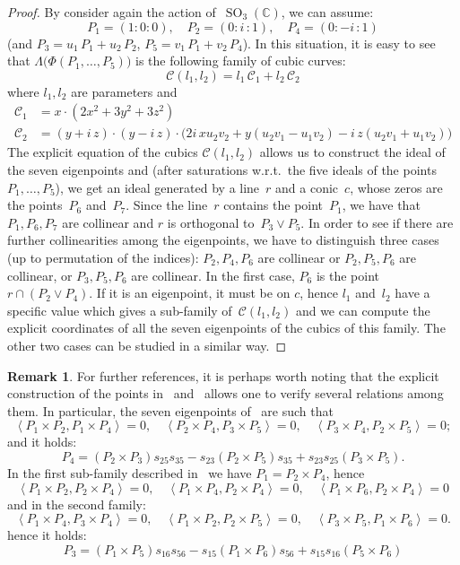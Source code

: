 \documentclass[a4paper, 11pt, reqno]{amsart}
\theoremstyle{plain}
\theoremstyle{definition}
\newtheorem{rmk}[lemma]{Remark}
\newcommand{\C}{\mathbb{C}}
\newcommand{\iii}{\textit{i}\,}
\newcommand{\SO}{\operatorname{SO}}
\newcommand{\scl}[2]{\left\langle {#1}, {#2} \right\rangle}
\begin{document}
\begin{proof}
By consider again the action of~$\SO_3(\C)$, we can assume:
%
\[
  P_1 = (1: 0: 0), \quad
  P_2 = (0: \iii: 1), \quad
  P_4 = (0: -\iii: 1)
\]
%
(and $P_3 = u_1 \, P_1 + u_2 \, P_2$, $P_5 = v_1 \, P_1 + v_2 \, P_4$). 
In this situation, it
is easy to see that $\Lambda\bigl(\Phi(P_1, \dots, P_5)\bigr)$
is the following family of cubic curves:
%
\[
  \mathcal{C}(l_1, l_2) = l_1 \, \mathcal{C}_1 + l_2 \, \mathcal{C}_2
\]
%
where $l_1, l_2$ are parameters and
%
\begin{align*}
  \mathcal{C}_1 & = x \cdot \left(2x^{2} + 3 y^{2} + 3 z^{2}\right)\\
  \mathcal{C}_2 & = (y + \iii z) \cdot (y - \iii z)
  \cdot \bigl(2 \iii x u_{2} v_{2} + y (u_{2} v_{1}- u_{1} v_{2})
  - \iii z (u_{2} v_{1} + u_{1} v_{2})\bigr)
\end{align*}
%
The explicit equation of the cubics $\mathcal{C}(l_1, l_2)$ allows us to
construct the ideal of the seven eigenpoints and (after
saturations w.r.t.\ the five ideals of the points $P_1, \dotsc, P_5$),
we get an ideal generated by a line~$r$ and a conic~$c$, whose zeros are
the points~$P_6$ and~$P_7$. Since the line~$r$ contains the point~$P_1$,
we have that $P_1, P_6, P_7$ are collinear and $r$ is orthogonal to~$P_3 \vee P_5$.
In order to see if there are further collinearities among the
eigenpoints, we have to distinguish three cases (up to permutation
of the indices): $P_2, P_4, P_6$ are collinear or $P_2, P_5, P_6$ are
collinear, or $P_3, P_5, P_6$ are collinear. In the first case, $P_6$
is the point $r \cap (P_2\vee P_4)$. If it is an eigenpoint, it must be
on $c$, hence $l_1$ and~$l_2$ have a specific value which gives a sub-family
of~$\mathcal{C}(l_1, l_2)$ and we can compute the explicit coordinates of
all the seven eigenpoints of the cubics of this family. The other two
cases can be studied in a similar way.
\end{proof}
\begin{rmk}
\label{rmk:three_orthog} For further references, it is perhaps worth noting that the explicit 
construction of the 
points in~ and~ allows one to verify
several relations among them. In particular, the seven eigenpoints
of~ are such that
\[
\scl{P_1\times P_2}{P_1 \times P_4}=0, \quad 
\scl{P_2\times P_4}{P_3 \times P_5}=0, \quad 
\scl{P_3\times P_4}{P_2 \times P_5}=0;
\]
and it holds:
\[
P_4 = (P_2\times P_3)s_{25}s_{35}-s_{23}(P_2\times P_5)s_{35}+ s_{23}s_{25}(P_3\times P_5).
\]
In the first sub-family described in~ we have 
$P_1 = P_2 \times P_4$, hence 
\[
\scl{P_1\times P_2}{P_2 \times P_4}=0, \quad 
\scl{P_1\times P_4}{P_2 \times P_4}=0, \quad 
\scl{P_1\times P_6}{P_2 \times P_4}=0
\]
and in the second family:
\[
\scl{P_1\times P_4}{P_3 \times P_4}=0, \quad 
\scl{P_1\times P_2}{P_2 \times P_5}=0, \quad 
\scl{P_3\times P_5}{P_1 \times P_6}=0.
\]
hence it holds:
\[
P_3 = (P_1 \times P_5)s_{16}s_{56}-s_{15}(P_1\times P_6)s_{56}+s_{15}s_{16}(P_5 \times P_6)
\]
\end{rmk}
%
\end{document}
